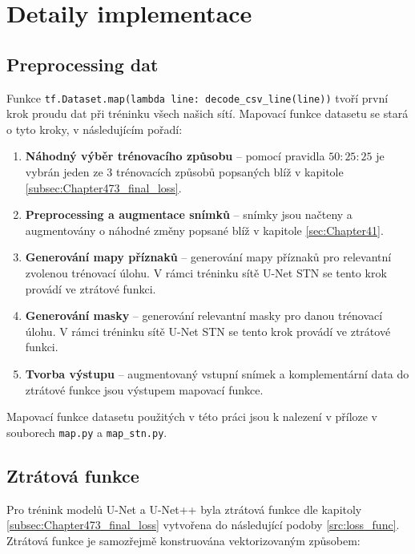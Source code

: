 \section{Detaily implementace}
\label{sec:Chapter55}

\subsection{Preprocessing dat}
Funkce \texttt{tf.Dataset.map(lambda line: decode\_csv\_line(line))} tvoří první krok proudu dat při tréninku všech našich sítí. Mapovací funkce datasetu se stará o tyto kroky, v následujícím pořadí:
\begin{enumerate}
    \item \textbf{Náhodný výběr trénovacího způsobu} -- pomocí pravidla $50:25:25$ je vybrán jeden ze 3 trénovacích způsobů popsaných blíž v kapitole \ref{subsec:Chapter473_final_loss}.
    \item \textbf{Preprocessing a augmentace snímků} -- snímky jsou načteny a augmentovány o náhodné změny popsané blíž v kapitole \ref{sec:Chapter41}.
    \item \textbf{Generování mapy příznaků} -- generování mapy příznaků pro relevantní zvolenou trénovací úlohu. V rámci tréninku sítě U-Net STN se tento krok provádí ve ztrátové funkci.
    \item \textbf{Generování masky} -- generování relevantní masky pro danou trénovací úlohu. V rámci tréninku sítě U-Net STN se tento krok provádí ve ztrátové funkci.
    \item \textbf{Tvorba výstupu} -- augmentovaný vstupní snímek a komplementární data do ztrátové funkce jsou výstupem mapovací funkce.
\end{enumerate}

Mapovací funkce datasetu použitých v této práci jsou k nalezení v příloze v souborech \texttt{map.py} a \texttt{map\_stn.py}.



\subsection{Ztrátová funkce}
\label{subsec:Chapter55_loss_func}

Pro trénink modelů U-Net a U-Net++ byla ztrátová funkce dle kapitoly \ref{subsec:Chapter473_final_loss} vytvořena do následující podoby \ref{src:loss_func}. Ztrátová funkce je samozřejmě konstruována vektorizovaným způsobem:

\label{src:loss_func}


